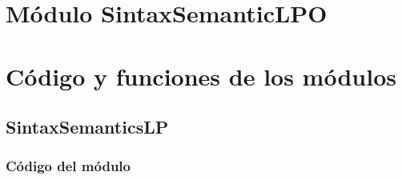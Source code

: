 \documentclass[a4paper]{report}
\begin{document}
\newpage

\section{Módulo SintaxSemanticLPO}

\section{Código y funciones de los módulos}
\subsection{SintaxSemanticsLP}
\subsubsection{Código del módulo}
\end{document}
